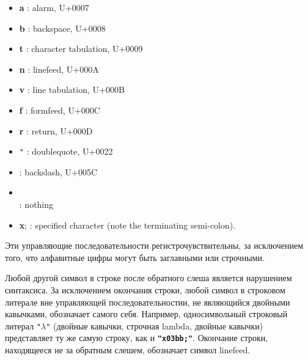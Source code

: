 \begin{itemize}
\item{\bfseries\cf\backwhack{}a} : alarm, U+0007
\item{\bfseries\cf\backwhack{}b} : backspace, U+0008
\item{\bfseries\cf\backwhack{}t} : character tabulation, U+0009
\item{\bfseries\cf\backwhack{}n} : linefeed, U+000A
\item{\bfseries\cf\backwhack{}v} : line tabulation, U+000B
\item{\bfseries\cf\backwhack{}f} : formfeed, U+000C
\item{\bfseries\cf\backwhack{}r} : return, U+000D
\item{\bfseries\cf\backwhack{}}\verb|"| : doublequote, U+0022
\item{\bfseries\cf\backwhack{}\backwhack{}} : backslash, U+005C
\item{\bfseries\cf\backwhack{}}\\\hspace*{2em} : nothing
\item{{\bfseries\cf\backwhack{}x};} : specified character (note the
  terminating semi-colon).
\end{itemize}

Эти управляющие последовательности регистрочувствительны, за исключением того, что алфавитные
цифры  могут быть заглавными или строчными.

Любой другой символ в строке после обратного слеша является нарушением синтаксиса. За
исключением окончания строки, любой символ в строковом литерале вне управляющей
последовательностии, не являющийся двойными кавычками, обозначает самого себя. Например,
односимвольный строковый литерал {\tt "$\lambda$"} (двойные кавычки, строчная lambda, двойные
кавычки) представляет ту же самую строку, как и {\tt\bfseries "\backwhack{}x03bb;"}. Окончание строки,
находящееся не за обратным слешем, обозначает символ linefeed.

